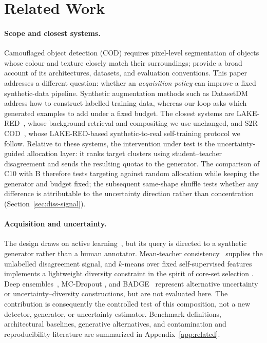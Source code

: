 \documentclass{article} %
\begin{document}
\section{Related Work}
\label{sec:related}

\paragraph{Scope and closest systems.}
Camouflaged object detection (COD) requires pixel-level segmentation of objects whose colour and
texture closely match their surroundings; \citet{fan2023advances} provide a broad account of its
architectures, datasets, and evaluation conventions. This paper addresses a different question:
whether an \emph{acquisition policy} can improve a fixed synthetic-data pipeline. Synthetic
augmentation methods such as DatasetDM~\cite{wu2023datasetdm} address how to construct labelled
training data, whereas our loop asks which generated examples to add under a fixed budget.
The closest systems are LAKE-RED~\cite{zhao2024lakered}, whose background retrieval and
compositing we use unchanged, and S2R-COD~\cite{luo2025s2rcod}, whose LAKE-RED-based
synthetic-to-real self-training protocol we follow. Relative to these systems, the intervention
under test is the uncertainty-guided allocation layer: it ranks target clusters using
student--teacher disagreement and sends the resulting quotas to the generator. The comparison of
C10 with B therefore tests targeting against random allocation while keeping the generator and
budget fixed; the subsequent same-shape shuffle tests whether any difference is attributable to
the uncertainty direction rather than concentration (Section~\ref{sec:diss-signal}).

\paragraph{Acquisition and uncertainty.}
The design draws on active learning~\cite{settles2009active}, but its query is directed to a
synthetic generator rather than a human annotator. Mean-teacher consistency~\cite{tarvainen2017mean}
supplies the unlabelled disagreement signal, and $k$-means over fixed self-supervised features
implements a lightweight diversity constraint in the spirit of core-set selection
\cite{sener2018active}. Deep ensembles~\cite{lakshminarayanan2017simple}, MC-Dropout
\cite{gal2016dropout}, and BADGE~\cite{ash2020deep} represent alternative uncertainty or
uncertainty--diversity constructions, but are not evaluated here. The contribution is consequently
the controlled test of this composition, not a new detector, generator, or uncertainty estimator.
Benchmark definitions, architectural baselines, generative alternatives, and contamination and
reproducibility literature are summarized in Appendix~\ref{app:related}.
\end{document}
